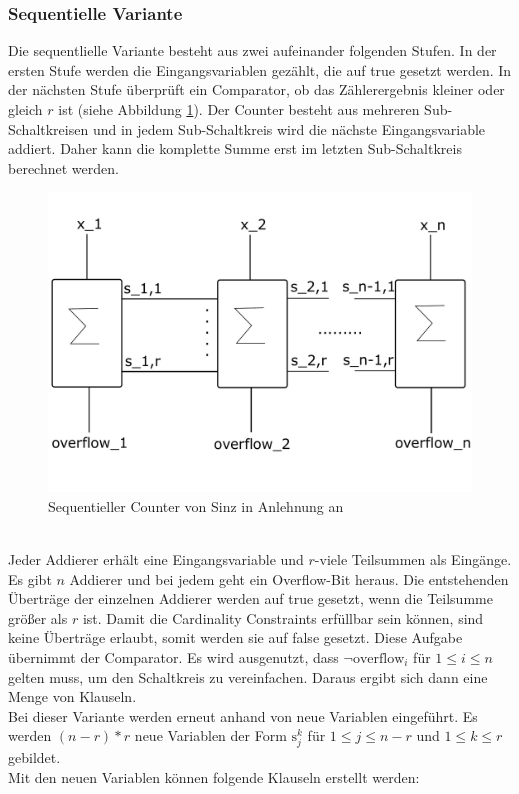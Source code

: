 \documentclass[a4,abstract=on]{scrartcl}
\begin{document}
		\subsubsection{Sequentielle Variante}
Die sequentlielle Variante besteht aus zwei aufeinander folgenden Stufen. In der ersten Stufe werden die Eingangsvariablen gezählt, die auf true gesetzt werden. In der nächsten Stufe überprüft ein Comparator, ob das Zählerergebnis kleiner oder gleich $r$ ist (siehe Abbildung \ref{fig:sinz_counter}). Der Counter besteht aus mehreren Sub-Schaltkreisen und in jedem Sub-Schaltkreis wird die nächste Eingangsvariable addiert. Daher kann die komplette Summe erst im letzten Sub-Schaltkreis berechnet werden. \\


\begin{figure}[H]
\centering
\includegraphics[width=\textwidth]{Sinz_seq.pdf}
\caption{Sequentieller Counter von Sinz in Anlehnung an \cite[][] {sinz}}
\label{fig:sinz_counter}
\end{figure}
\ \\
Jeder Addierer erhält eine Eingangsvariable und $r$-viele Teilsummen als Eingänge. Es gibt $n$ Addierer und bei jedem geht ein Overflow-Bit heraus. Die entstehenden Überträge der einzelnen Addierer werden auf true gesetzt, wenn die Teilsumme größer als $r$ ist. Damit die Cardinality Constraints erfüllbar sein können, sind keine Überträge erlaubt, somit werden sie auf false gesetzt. Diese Aufgabe übernimmt der Comparator. Es wird ausgenutzt, dass $\neg \text{overflow}_i$ für $1 \leq i \leq n$ gelten muss, um den Schaltkreis zu vereinfachen. Daraus ergibt sich dann eine Menge von Klauseln.\\
Bei dieser Variante werden erneut anhand von \cite[][]{knuth} neue Variablen eingeführt. Es werden $(n-r)*r$ neue Variablen der Form $\text{s}_j^k$ für $1 \leq j \leq n - r$ und $1 \leq k \leq r$ gebildet. \\
Mit den neuen Variablen können folgende Klauseln erstellt werden:\\
\end{document}
